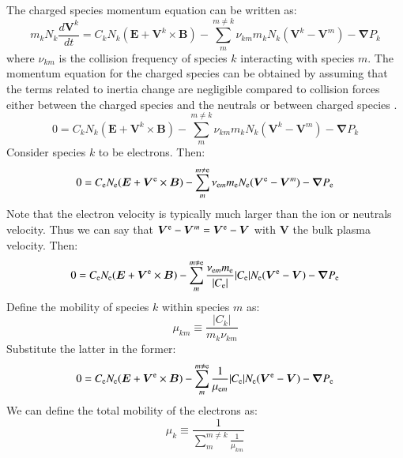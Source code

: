 \documentclass{warpdoc}
\renewcommand{\vec}[1]{\bm{#1}}
\begin{document}
The charged species momentum equation can be written as:
%
\begin{equation}
m_k N_k \frac{d \vec{V}^k}{dt}= C_k N_k (\vec{E}+ \vec{V}^k \times \vec{B}) - \sum_{m}^{m\ne k} \nu_{km} m_k N_k  (\vec{V}^k - \vec{V}^m) - \vec{\nabla} P_k 
\end{equation}
%
where $\nu_{km}$ is the collision frequency of species $k$ interacting with species $m$. The momentum equation for the charged species can be obtained by assuming that the terms related to inertia change are negligible compared to collision forces either between the charged species and the neutrals or between charged species \cite{jcp:2011:parent}.
%
\begin{equation}
0= C_k N_k (\vec{E}+ \vec{V}^k \times \vec{B}) - \sum_{m}^{m\ne k} \nu_{km} m_k N_k  (\vec{V}^k - \vec{V}^m) - \vec{\nabla} P_k 
\end{equation}
%
Consider species $k$ to be electrons. Then:
%
\begin{equation}
0= C_{\rm e} N_{\rm e} (\vec{E}+ \vec{V}^{\rm e} \times \vec{B}) - \sum_{m}^{m\ne {\rm e}} \nu_{{\rm e}m} m_{\rm e} N_{\rm e}  (\vec{V}^{\rm e} - \vec{V}^m) - \vec{\nabla} P_{\rm e} 
\end{equation}
%
Note that the electron velocity is typically much larger than the ion or neutrals velocity. Thus we can say that $\vec{V}^{\rm e}-\vec{V}^m=\vec{V}^{\rm e}-\vec{V}$ with $\vec{V}$ the bulk plasma velocity. Then:
%
\begin{equation}
0= C_{\rm e} N_{\rm e} (\vec{E}+ \vec{V}^{\rm e} \times \vec{B}) - \sum_{m}^{m\ne {\rm e}} \frac{\nu_{{\rm e}m} m_{\rm e}}{|C_{\rm e}|} |C_{\rm e}| N_{\rm e}  (\vec{V}^{\rm e} - \vec{V}) - \vec{\nabla} P_{\rm e} 
\end{equation}
%
Define the mobility of species $k$ within species $m$ as:
%
\begin{equation}
 \mu_{km} \equiv \frac{|C_k|}{m_k \nu_{km}}
\end{equation}
%
Substitute the latter in the former:
%
\begin{equation}
0= C_{\rm e} N_{\rm e} (\vec{E}+ \vec{V}^{\rm e} \times \vec{B}) - \sum_{m}^{m\ne {\rm e}} \frac{1}{\mu_{{\rm e}m}} |C_{\rm e}| N_{\rm e}  (\vec{V}^{\rm e} - \vec{V}) - \vec{\nabla} P_{\rm e} 
\end{equation}
%
We can define the total mobility of the electrons as:
%
\begin{equation}
\mu_k \equiv  \frac{1}{\sum_m^{m\ne k} \frac{1}{\mu_{km}}} 
\end{equation}
\end{document}

